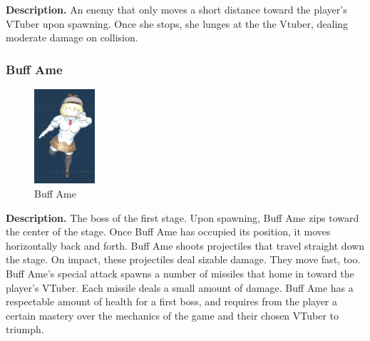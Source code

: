 \documentclass[10pt, a4paper]{article}
\begin{document}
\begin{multicols}{2}
	\textbf{Description.} An enemy that only moves a short distance toward the player's VTuber upon spawning. Once she stops, she lunges at the the Vtuber, dealing moderate damage on collision.
	
	\subsubsection{Buff Ame}

	\begin{figure}[H]
		\centering
		\includegraphics[width=0.2\textwidth]{images/buff_ame1.png}
		\caption{Buff Ame}
		\label{fig:buffame}
	\end{figure}

	\textbf{Description.} The boss of the first stage. Upon spawning, Buff Ame zips toward the center of the stage. Once Buff Ame has occupied its position, it moves horizontally back and forth. Buff Ame shoots projectiles that travel straight down the stage. On impact, these projectiles deal sizable damage. They move fast, too. Buff Ame's special attack spawns a number of missiles that home in toward the player's VTuber. Each missile deals a small amount of damage. Buff Ame has a respectable amount of health for a first boss, and requires from the player a certain mastery over the mechanics of the game and their chosen VTuber to triumph.

	\end{multicols}
\end{document}
